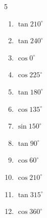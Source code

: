 \begin{multicols}{5}
\begin{enumerate}
        \phantom{$\displaystyle =-1$}

  \item $\displaystyle \tan{210^\circ}$


  \item $\displaystyle \tan{240^\circ}$


  \item $\displaystyle \cos{0^\circ}$

        \phantom{$\displaystyle =1$}

  \item $\displaystyle \cos{225^\circ}$


  \item $\displaystyle \tan{180^\circ}$

        \phantom{$\displaystyle =0$}

  \item $\displaystyle \cos{135^\circ}$


\columnbreak %

  \item $\displaystyle \sin{150^\circ}$


  \item $\displaystyle \tan{90^\circ}$

        \phantom{$\displaystyle なし$}

  \item $\displaystyle \cos{60^\circ}$


  \item $\displaystyle \cos{210^\circ}$


  \item $\displaystyle \tan{315^\circ}$

        \phantom{$\displaystyle =-1$}

  \item $\displaystyle \cos{360^\circ}$

        \phantom{$\displaystyle =1$}


\end{enumerate}
\end{multicols}
